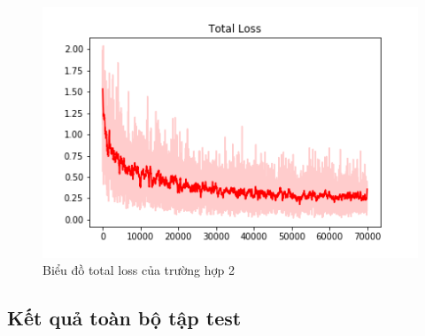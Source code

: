 \begin{center}
    \begin{figure}[H]
    \centering
    \includegraphics[width=0.9\columnwidth]{images/chap3/Total_Loss.png}
    \caption{Biểu đồ total loss của trường hợp 2}
    \label{fig:my_label}
    \end{figure}
\end{center}
\subsection{Kết quả toàn bộ tập test}
